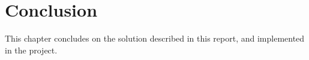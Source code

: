 \chapter{Conclusion}\label{chap:conclusion}

This chapter concludes on the solution described in this report,  and implemented in the project. 




